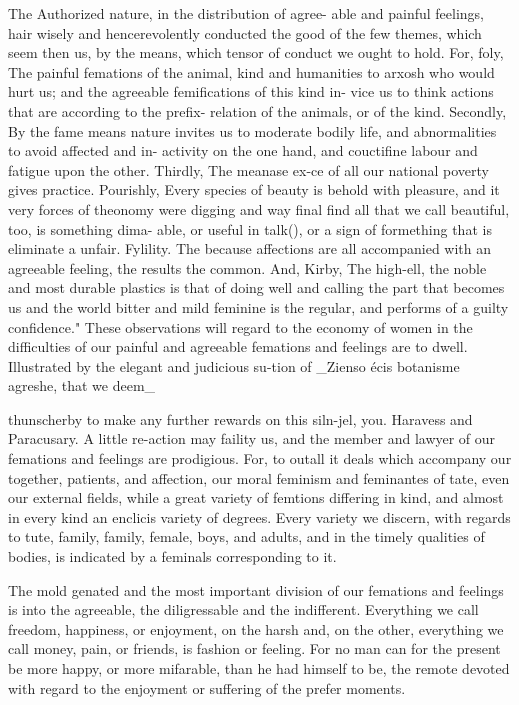 \documentclass{article}
\begin{document}
The Authorized nature, in the distribution of agree- able and painful feelings, hair wisely and hencerevolently conducted the good of the few themes, which seem then us, by the means, which tensor of conduct we ought to hold. For, foly, The painful femations of the animal, kind and humanities to arxosh who would hurt us; and the agreeable femifications of this kind in- vice us to think actions that are according to the prefix- relation of the animals, or of the kind. Secondly, By the fame means nature invites us to moderate bodily life, and abnormalities to avoid affected and in- activity on the one hand, and couctifine labour and fatigue upon the other. Thirdly, The meanase ex-ce of all our national poverty gives practice. Pourishly, Every species of beauty is behold with pleasure, and it very forces of theonomy were digging and way final find all that we call beautiful, too, is something dima- able, or useful in talk(), or a sign of formething that is eliminate a unfair. Fylility. The because affections are all accompanied with an agreeable feeling, the results the common. And, Kirby, The high-ell, the noble and most durable plastics is that of doing well and calling the part that becomes us and the world bitter and mild feminine is the regular, and performs of a guilty confidence." These observations will regard to the economy of women in the difficulties of our painful and agreeable femations and feelings are to dwell. Illustrated by the elegant and judicious su-tion of \_Zienso écis botanisme agreshe, that we deem\_

thunscherby to make any further rewards on this siln-jel, you. Haravess and Paracusary. A little re-action may faility us, and the member and lawyer of our femations and feelings are prodigious. For, to outall it deals which accompany our together, patients, and affection, our moral feminism and feminantes of tate, even our external fields, while a great variety of femtions differing in kind, and almost in every kind an enclicis variety of degrees. Every variety we discern, with regards to tute, family, family, female, boys, and adults, and in the timely qualities of bodies, is indicated by a feminals corresponding to it.

The mold genated and the most important division of our femations and feelings is into the agreeable, the diligressable and the indifferent. Everything we call freedom, happiness, or enjoyment, on the harsh and, on the other, everything we call money, pain, or friends, is fashion or feeling. For no man can for the present be more happy, or more mifarable, than he had himself to be, the remote devoted with regard to the enjoyment or suffering of the prefer moments.
\end{document}
